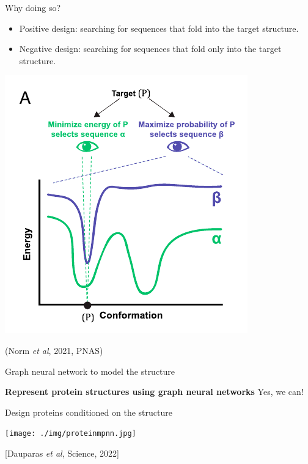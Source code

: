 \documentclass[presentation,smaller]{beamer}
\begin{document}
\begin{frame}[label={sec:org1e915fb}]{Why doing so?}
\begin{itemize}
\item Positive design: searching for sequences that fold into the target structure.
\item Negative design: searching for sequences that fold \alert{only} into the target structure.
\end{itemize}

\begin{center}
\includegraphics[scale=0.7]{./img/af_landscape_optimization.png}
\end{center}

(Norm \emph{et al}, 2021, PNAS)
\end{frame}

\begin{frame}[label={sec:orgfb54203}]{Graph neural network to model the structure}
\begin{center}
\Large \textbf{Represent protein structures using graph neural networks}
Yes, we can!
\end{center}
\end{frame}
\begin{frame}[label={sec:org9925c99}]{Design proteins conditioned on the structure}
\begin{center}
\texttt{[image: ./img/proteinmpnn.jpg]}
\end{center}
[Dauparas \emph{et al}, Science, 2022]
\end{frame}
\end{document}

